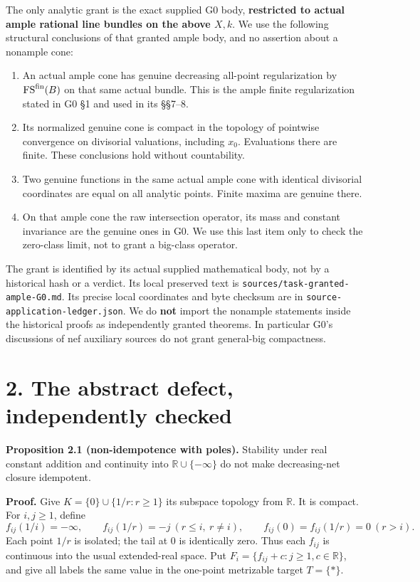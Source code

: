 \documentclass[10pt]{article}
\providecommand{\tightlist}{\setlength{\itemsep}{0pt}\setlength{\parskip}{0pt}}
\begin{document}
The only analytic grant is the exact supplied G0 body,
\textbf{restricted to actual ample rational line bundles on the above
\(X,k\)}. We use the following structural conclusions of that granted
ample body, and no assertion about a nonample cone:

\begin{enumerate}
\def\labelenumi{\arabic{enumi}.}
\tightlist
\item
  An actual ample cone has genuine decreasing all-point regularization
  by \(\operatorname{FS}^{\rm fin}(B)\) on that same actual bundle. This
  is the ample finite regularization stated in G0 §1 and used in its
  §§7--8.
\item
  Its normalized genuine cone is compact in the topology of pointwise
  convergence on divisorial valuations, including \(x_0\). Evaluations
  there are finite. These conclusions hold without countability.
\item
  Two genuine functions in the same actual ample cone with identical
  divisorial coordinates are equal on all analytic points. Finite maxima
  are genuine there.
\item
  On that ample cone the raw intersection operator, its mass and
  constant invariance are the genuine ones in G0. We use this last item
  only to check the zero-class limit, not to grant a big-class operator.
\end{enumerate}

The grant is identified by its actual supplied mathematical body, not by
a historical hash or a verdict. Its local preserved text is
\texttt{sources/task-granted-ample-G0.md}. Its precise local coordinates
and byte checksum are in \texttt{source-application-ledger.json}. We do
\textbf{not} import the nonample statements inside the historical proofs
as independently granted theorems. In particular G0's discussions of nef
auxiliary sources do not grant general-big compactness.

\section{2. The abstract defect, independently
checked}\label{the-abstract-defect-independently-checked}

\textbf{Proposition 2.1 (non-idempotence with poles).} Stability under
real constant addition and continuity into \(\mathbb R\cup\{-\infty\}\)
do not make decreasing-net closure idempotent.

\textbf{Proof.} Give \(K=\{0\}\cup\{1/r:r\geq1\}\) its subspace topology
from \(\mathbb R\). It is compact. For \(i,j\geq1\), define \[
 f_{ij}(1/i)=-\infty,\qquad
 f_{ij}(1/r)=-j\ (r\leq i,\ r\ne i),\qquad
 f_{ij}(0)=f_{ij}(1/r)=0\ (r>i).
 \tag{2.1}
\] Each point \(1/r\) is isolated; the tail at 0 is identically zero.
Thus each \(f_{ij}\) is continuous into the usual extended-real space.
Put \(F_i=\{f_{ij}+c:j\geq1,c\in\mathbb R\}\), and give all labels the
same value in the one-point metrizable target \(T=\{*\}\).
\end{document}
